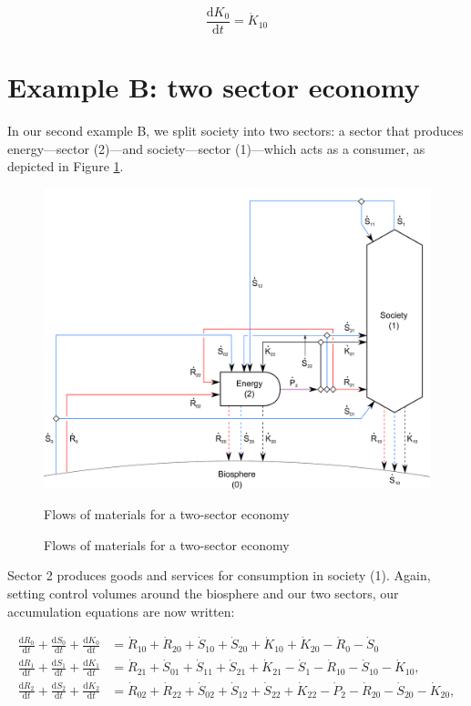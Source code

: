 \begin{equation} \label{eq:A_K0_balance}
	\frac{\mathrm{d}K_{0}}{\mathrm{d}t}		
	= \dot{K}_{10}
\end{equation}



\newpage
\section{Example B: two sector economy}
\label{sec:B_materials}

In our second example B, we split society into two sectors: a sector that produces energy---sector (2)---and society---sector (1)---which acts as a consumer, as depicted in Figure \ref{fig:B_materials}. 

\begin{figure}[h!]
\centering
\includegraphics[width=0.8\linewidth]{Part_1/Chapter_Materials/images/2_sector_materials.pdf}
\caption{Flows of materials for a two-sector economy}{Flows of materials for a two-sector economy}
\label{fig:B_materials}
\end{figure}

Sector 2 produces goods and services for consumption in society (1). Again, setting control volumes around the biosphere and our two sectors, our accumulation equations are now written:

\begin{align} \label{eq:B_CV_0_to_2}
	\frac{\mathrm{d}R_{0}}{\mathrm{d}t} 
	+ \frac{\mathrm{d}S_{0}}{\mathrm{d}t}	
	+ \frac{\mathrm{d}K_0}{\mathrm{d}t}		&
	=  \dot{R}_{10} + \dot{R}_{20} 
	+ \dot{S}_{10} + \dot{S}_{20} 
	+ \dot{K}_{10} + \dot{K}_{20} 
	- \dot{R}_{0} 
	- \dot{S}_{0} 							\\
	\frac{\mathrm{d}R_{1}}{\mathrm{d}t} 
	+ \frac{\mathrm{d}S_{1}}{\mathrm{d}t}	
	+ \frac{\mathrm{d}K_{1}}{\mathrm{d}t}	&
	=  \dot{R}_{21} 
	+ \dot{S}_{01} 
	+ \dot{S}_{11} 
	+ \dot{S}_{21}
	+ \dot{K}_{21}
	- \dot{S}_{1} 
	- \dot{R}_{10} 
	- \dot{S}_{10} 
	- \dot{K}_{10},							\\
	\frac{\mathrm{d}R_{2}}{\mathrm{d}t} 
	+ \frac{\mathrm{d}S_{2}}{\mathrm{d}t}
	+ \frac{\mathrm{d}K_{2}}{\mathrm{d}t}	&
	=  \dot{R}_{02} 
	+ \dot{R}_{22} 
	+ \dot{S}_{02} 
	+ \dot{S}_{12} 
	+ \dot{S}_{22} 
	+ \dot{K}_{22}
	- \dot{P}_{2}
	- \dot{R}_{20} 
	- \dot{S}_{20} 
	- \dot{K}_{20},
\end{align}

